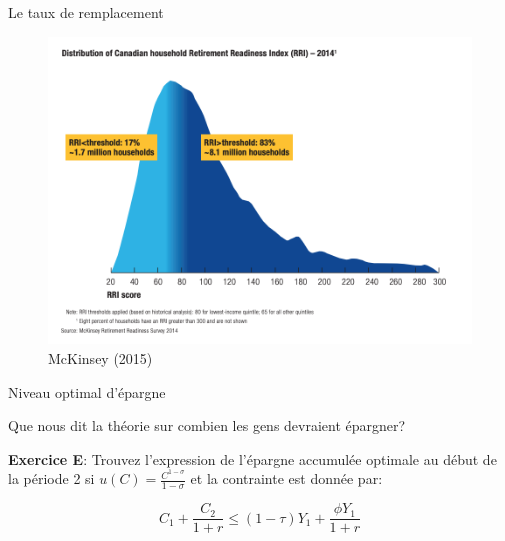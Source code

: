 \documentclass[handout]{beamer}
\begin{document}
\begin{frame}{Le taux de remplacement}

\begin{figure}
\includegraphics[scale=0.4]{mckinsey.png} 
\caption{McKinsey (2015)}
\end{figure}
	
\end{frame}

\begin{frame}{Niveau optimal d'épargne}

Que nous dit la théorie sur combien les gens devraient épargner?\vspace{0.25in}

\textbf{Exercice E}: Trouvez l'expression de l'épargne accumulée optimale au début de la période 2 si $u(C)=\frac{C^{1-\sigma}}{1-\sigma}$ et la contrainte est donnée par:

$$ C_1 + \frac{C_2}{1+r} \leq (1-\tau)Y_1 + \frac{\phi Y_1}{1+r}  $$ 

\end{frame}
\end{document}
